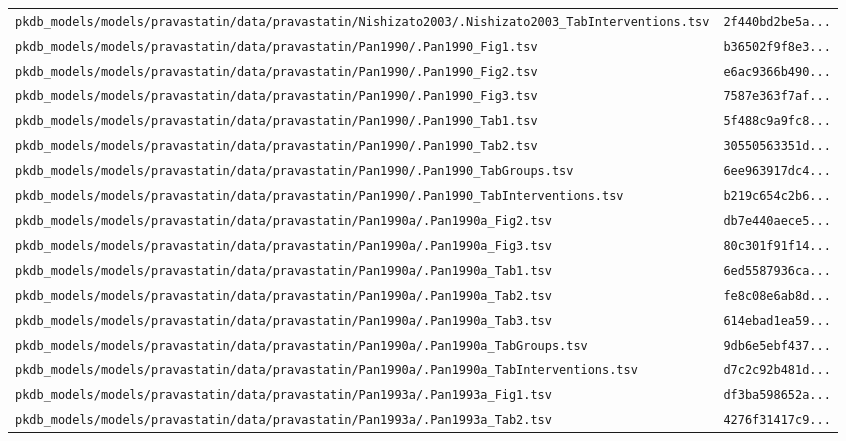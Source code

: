 \begin{longtable}{ll}
\texttt{pkdb\_models/models/pravastatin/data/pravastatin/Nishizato2003/.Nishizato2003\_TabInterventions.tsv} & \texttt{2f440bd2be5a...} \\
\texttt{pkdb\_models/models/pravastatin/data/pravastatin/Pan1990/.Pan1990\_Fig1.tsv} & \texttt{b36502f9f8e3...} \\
\texttt{pkdb\_models/models/pravastatin/data/pravastatin/Pan1990/.Pan1990\_Fig2.tsv} & \texttt{e6ac9366b490...} \\
\texttt{pkdb\_models/models/pravastatin/data/pravastatin/Pan1990/.Pan1990\_Fig3.tsv} & \texttt{7587e363f7af...} \\
\texttt{pkdb\_models/models/pravastatin/data/pravastatin/Pan1990/.Pan1990\_Tab1.tsv} & \texttt{5f488c9a9fc8...} \\
\texttt{pkdb\_models/models/pravastatin/data/pravastatin/Pan1990/.Pan1990\_Tab2.tsv} & \texttt{30550563351d...} \\
\texttt{pkdb\_models/models/pravastatin/data/pravastatin/Pan1990/.Pan1990\_TabGroups.tsv} & \texttt{6ee963917dc4...} \\
\texttt{pkdb\_models/models/pravastatin/data/pravastatin/Pan1990/.Pan1990\_TabInterventions.tsv} & \texttt{b219c654c2b6...} \\
\texttt{pkdb\_models/models/pravastatin/data/pravastatin/Pan1990a/.Pan1990a\_Fig2.tsv} & \texttt{db7e440aece5...} \\
\texttt{pkdb\_models/models/pravastatin/data/pravastatin/Pan1990a/.Pan1990a\_Fig3.tsv} & \texttt{80c301f91f14...} \\
\texttt{pkdb\_models/models/pravastatin/data/pravastatin/Pan1990a/.Pan1990a\_Tab1.tsv} & \texttt{6ed5587936ca...} \\
\texttt{pkdb\_models/models/pravastatin/data/pravastatin/Pan1990a/.Pan1990a\_Tab2.tsv} & \texttt{fe8c08e6ab8d...} \\
\texttt{pkdb\_models/models/pravastatin/data/pravastatin/Pan1990a/.Pan1990a\_Tab3.tsv} & \texttt{614ebad1ea59...} \\
\texttt{pkdb\_models/models/pravastatin/data/pravastatin/Pan1990a/.Pan1990a\_TabGroups.tsv} & \texttt{9db6e5ebf437...} \\
\texttt{pkdb\_models/models/pravastatin/data/pravastatin/Pan1990a/.Pan1990a\_TabInterventions.tsv} & \texttt{d7c2c92b481d...} \\
\texttt{pkdb\_models/models/pravastatin/data/pravastatin/Pan1993a/.Pan1993a\_Fig1.tsv} & \texttt{df3ba598652a...} \\
\texttt{pkdb\_models/models/pravastatin/data/pravastatin/Pan1993a/.Pan1993a\_Tab2.tsv} & \texttt{4276f31417c9...} \\

\end{longtable}
